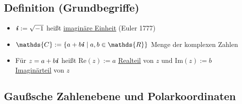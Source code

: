 \documentclass[a4paper, 12pt,titlepage, pdf, headsepline]{scrartcl}
\newcommand{\R}{\mathds{R}}
\newcommand{\uline}[1]{\underline{#1}}
\renewcommand{\Re}[1]{\text{Re}(#1)}
\renewcommand{\Im}[1]{\text{Im}(#1)}
\renewcommand{\i}{\textbf{\textit{i}}}
\renewcommand{\>}{\rightarrow}
\renewcommand{\*}{\cdot}
\begin{document}
		      	\subsection{Definition (Grundbegriffe)}
		      	\begin{itemize}
		      		\item $\i  := \sqrt{-1}$ heißt \uline{imaginäre Einheit} (Euler 1777)
		      		\item $\mathds{C} := \{a +b\i \mid a,b \in \R \}$ Menge der komplexen Zahlen
		      		\item Für $z = a +b\i$ heißt $\Re{z} :=a$ \uline{Realteil} von $z$ und $\Im{z} := b$ \uline{Imaginärteil} von $z$
		      	\end{itemize}
		      	\subsection*{Gaußsche Zahlenebene und Polarkoordinaten}
\end{document}
